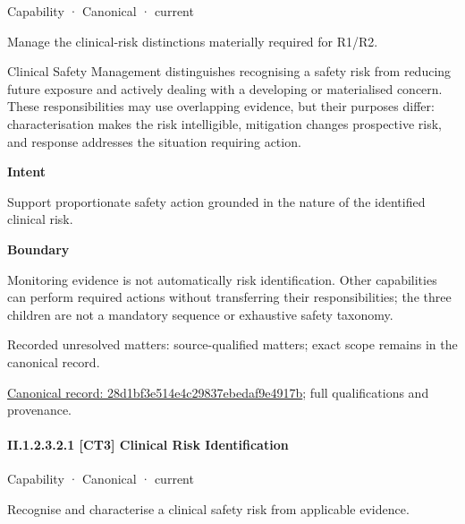 \label{element:28d1bf3e514e4c29837ebedaf9e4917b}
{\small Capability · Canonical · current}\par

Manage the clinical-risk distinctions materially required for R1/R2.



Clinical Safety Management distinguishes recognising a safety risk from reducing future exposure and actively dealing with a developing or materialised concern. These responsibilities may use overlapping evidence, but their purposes differ: characterisation makes the risk intelligible, mitigation changes prospective risk, and response addresses the situation requiring action.



\textbf{Intent}



Support proportionate safety action grounded in the nature of the identified clinical risk.



\textbf{Boundary}



Monitoring evidence is not automatically risk identification. Other capabilities can perform required actions without transferring their responsibilities; the three children are not a mandatory sequence or exhaustive safety taxonomy.


{\small Recorded unresolved matters: source-qualified matters; exact scope remains in the canonical record.}\par
{\footnotesize \href{../../../../continuum/strategy/capability/28d1bf3e514e4c29837ebedaf9e4917b.md}{Canonical record: 28d1bf3e514e4c29837ebedaf9e4917b}; full qualifications and provenance.}\par
\paragraph*{II.1.2.3.2.1 [CT3] Clinical Risk Identification}
\label{navigation:II.1.2.3.2.1}

\label{element:d54c19c6efaf42af82ad71a4142149d4}
{\small Capability · Canonical · current}\par

Recognise and characterise a clinical safety risk from applicable evidence.



